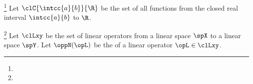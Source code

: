 \begin{example}
\footnote{
  }
Let $\clC{\intcc{a}{b}}{\R}$ be the set of all  functions from the closed real interval $\intcc{a}{b}$ to $\R$.
\end{example}

\begin{theorem}
\footnote{
  }
Let $\clLxy$ be the set of linear operators from a linear space $\spX$ to a linear space $\spY$.
Let $\oppN(\opL)$ be the  of a linear operator $\opL\in\clLxy$.
\end{theorem}
